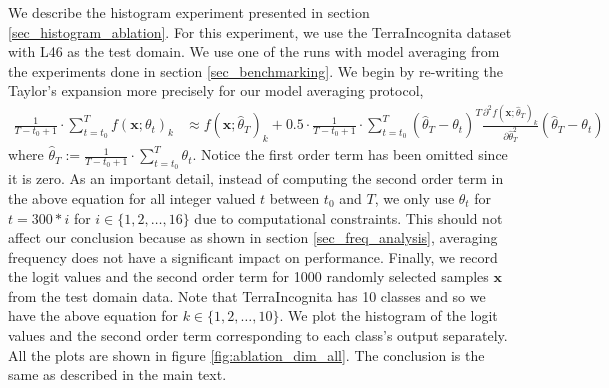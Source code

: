 We describe the histogram experiment presented in section \ref{sec_histogram_ablation}. For this experiment, we use the TerraIncognita dataset with L46 as the test domain. We use one of the runs with model averaging from the experiments done in section \ref{sec_benchmarking}. We begin by re-writing the Taylor's expansion more precisely for our model averaging protocol,
\begin{align}
    \frac{1}{T-t_0+1}\cdot \sum_{t=t_0}^{T} f(\mathbf{x}; {\theta_t})_k &\approx f(\mathbf{x}; \hat{\theta}_{T})_k + 0.5 \cdot \frac{1}{T-t_0+1}\cdot \sum_{t=t_0}^{T} (\hat{\theta}_{T} - {\theta}_t)^T  \frac{\partial^2 f(\mathbf{x}; {\hat{\theta}_{T}})_k }{\partial \hat{\theta}_{T}^2} (\hat{\theta}_{T} - {\theta}_t)
\end{align}
where $\hat{\theta}_T := \frac{1}{T-t_0+1}\cdot \sum_{t=t_0}^{T} {\theta}_t$. Notice the first order term has been omitted since it is zero. As an important detail, instead of computing the second order term in the above equation for all integer valued $t$ between $t_0$ and $T$, we only use $\theta_t$ for $t = 300*i$ for $i \in \{1,2,\hdots, 16\}$ due to computational constraints. This should not affect our conclusion because as shown in section \ref{sec_freq_analysis}, averaging frequency does not have a significant impact on performance. Finally, we record the logit values and the second order term for 1000 randomly selected samples $\mathbf{x}$ from the test domain data. Note that TerraIncognita has 10 classes and so we have the above equation for $k \in \{1,2, \hdots, 10\}$. We plot the histogram of the logit values and the second order term corresponding to each class's output separately. All the plots are shown in figure \ref{fig:ablation_dim_all}. The conclusion is the same as described in the main text.

